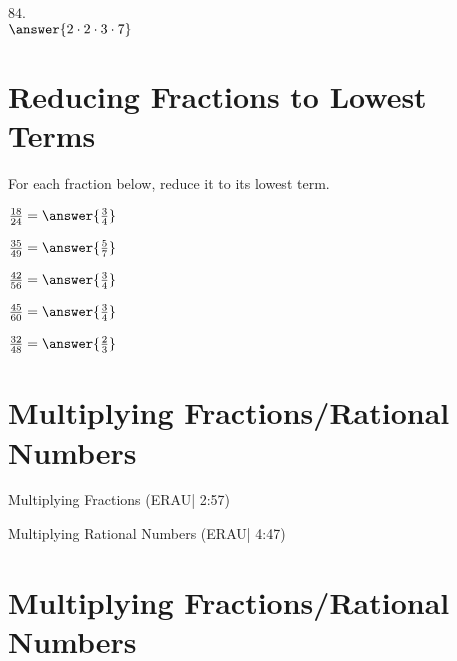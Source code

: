 \documentclass{ximera}
\begin{document}
\begin{problem}
$84$.\\
$\answer{2 \cdot 2 \cdot 3 \cdot 7}$
\end{problem}



\section*{Reducing Fractions to Lowest Terms}

For each fraction below, reduce it to its lowest term.

\begin{problem}
$\frac{18}{24} = \answer{\frac{3}{4}}$
\end{problem}

\begin{problem}
$\frac{35}{49} = \answer{\frac{5}{7}}$
\end{problem}

\begin{problem}
$\frac{42}{56} = \answer{\frac{3}{4}}$
\end{problem}

\begin{problem}
$\frac{45}{60} = \answer{\frac{3}{4}}$
\end{problem}

\begin{problem}
$\frac{32}{48} = \answer{\frac{2}{3}}$
\end{problem}


\section*{Multiplying Fractions/Rational Numbers}

Multiplying Fractions (ERAU| 2:57)


Multiplying Rational Numbers (ERAU| 4:47)



\section*{Multiplying Fractions/Rational Numbers}
\end{document}

